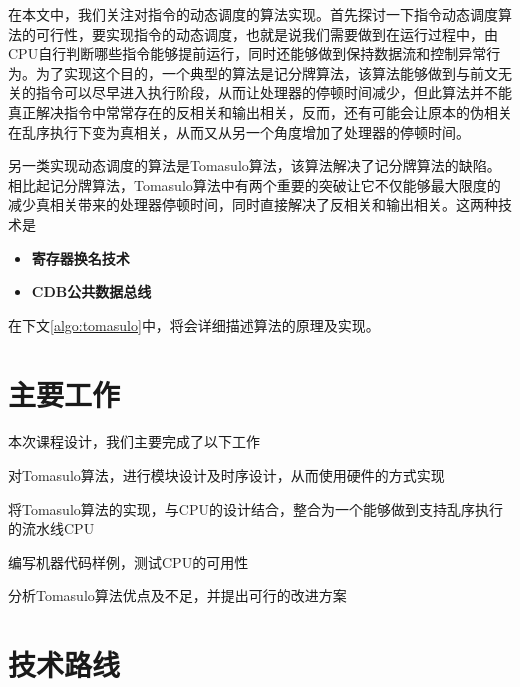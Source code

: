 \documentclass[twoside]{article}
\begin{document}
在本文中，我们关注对指令的动态调度的算法实现。首先探讨一下指令动态调度算法的可行性，要实现指令的动态调度，也就是说我们需要做到在运行过程中，由CPU自行判断哪些指令能够提前运行，同时还能够做到保持数据流和控制异常行为。为了实现这个目的，一个典型的算法是记分牌算法，该算法能够做到与前文无关的指令可以尽早进入执行阶段，从而让处理器的停顿时间减少，但此算法并不能真正解决指令中常常存在的反相关和输出相关，反而，还有可能会让原本的伪相关在乱序执行下变为真相关，从而又从另一个角度增加了处理器的停顿时间。

另一类实现动态调度的算法是Tomasulo算法，该算法解决了记分牌算法的缺陷。相比起记分牌算法，Tomasulo算法中有两个重要的突破\cite{wiki:tomasulo}让它不仅能够最大限度的减少真相关带来的处理器停顿时间，同时直接解决了反相关和输出相关。这两种技术是
\begin{itemize}
	\item \textbf{寄存器换名技术} 
	\item \textbf{CDB公共数据总线}
\end{itemize}
在下文\autoref{algo:tomasulo}中，将会详细描述算法的原理及实现。



\section{主要工作}
本次课程设计，我们主要完成了以下工作
\begin{compactitem}
	\item 对Tomasulo算法，进行模块设计及时序设计，从而使用硬件的方式实现
	\item 将Tomasulo算法的实现，与CPU的设计结合，整合为一个能够做到支持乱序执行的流水线CPU
	\item 编写机器代码样例，测试CPU的可用性
	\item 分析Tomasulo算法优点及不足，并提出可行的改进方案
\end{compactitem}

\section{技术路线}

\end{document}

